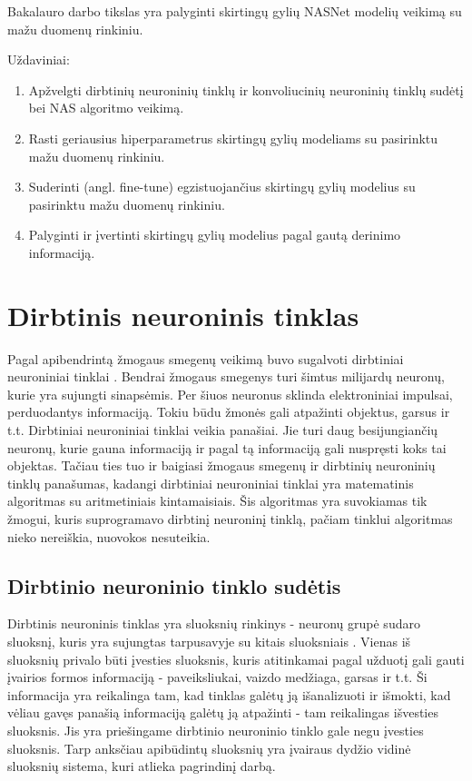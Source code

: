 \documentclass{VUMIFPSbakalaurinis}
\begin{document}
Bakalauro darbo tikslas yra palyginti skirtingų gylių NASNet modelių veikimą su mažu duomenų rinkiniu.

Uždaviniai:
\begin{enumerate}
    \item Apžvelgti dirbtinių neuroninių tinklų ir konvoliucinių neuroninių tinklų sudėtį bei NAS algoritmo veikimą.
    \item Rasti geriausius hiperparametrus skirtingų gylių modeliams su pasirinktu mažu duomenų rinkiniu.
    \item Suderinti (angl. fine-tune) egzistuojančius skirtingų gylių modelius su pasirinktu mažu duomenų rinkiniu.
    \item Palyginti ir įvertinti skirtingų gylių modelius pagal gautą derinimo informaciją.
\end{enumerate}

\section{Dirbtinis neuroninis tinklas}
Pagal apibendrintą žmogaus smegenų veikimą buvo sugalvoti dirbtiniai neuroniniai tinklai \cite{Goodfellow-et-al-2016}. Bendrai žmogaus smegenys turi šimtus
milijardų neuronų, kurie yra sujungti sinapsėmis. Per šiuos neuronus sklinda elektroniniai impulsai, perduodantys informaciją. Tokiu būdu žmonės gali 
atpažinti objektus, garsus ir t.t. Dirbtiniai neuroniniai tinklai veikia panašiai. Jie turi daug besijungiančių neuronų, kurie gauna informaciją ir 
pagal tą informaciją gali nuspręsti koks tai objektas. Tačiau ties tuo ir baigiasi žmogaus smegenų ir dirbtinių neuroninių tinklų panašumas, 
kadangi dirbtiniai neuroniniai tinklai yra matematinis algoritmas su aritmetiniais kintamaisiais. Šis algoritmas yra suvokiamas 
tik žmogui, kuris suprogramavo dirbtinį neuroninį tinklą, pačiam tinklui algoritmas nieko nereiškia, nuovokos nesuteikia.

\subsection{Dirbtinio neuroninio tinklo sudėtis}
Dirbtinis neuroninis tinklas yra sluoksnių rinkinys - neuronų grupė sudaro sluoksnį, kuris yra sujungtas tarpusavyje su kitais sluoksniais \cite{1193152}. Vienas iš
sluoksnių privalo būti įvesties sluoksnis, kuris atitinkamai pagal užduotį gali gauti įvairios formos informaciją - paveiksliukai, vaizdo
medžiaga, garsas ir t.t. Ši informacija yra reikalinga tam, kad tinklas galėtų ją išanalizuoti ir išmokti, kad vėliau gavęs panašią
informaciją galėtų ją atpažinti - tam reikalingas išvesties sluoksnis. Jis yra priešingame dirbtinio neuroninio tinklo gale negu įvesties sluoksnis.
Tarp anksčiau apibūdintų sluoksnių yra įvairaus dydžio vidinė sluoksnių sistema, kuri atlieka pagrindinį darbą.
\end{document}

